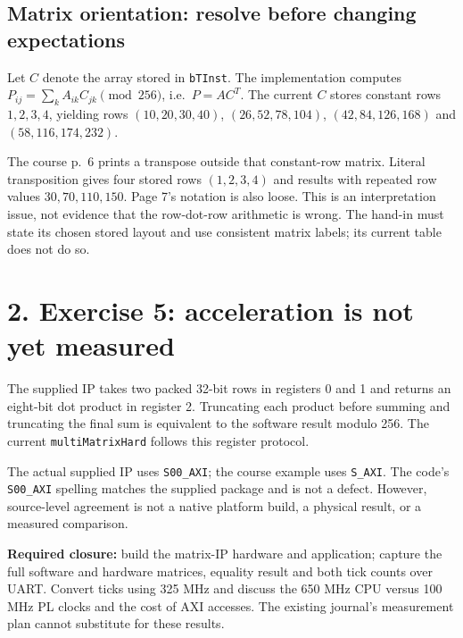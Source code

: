 \documentclass[11pt,a4paper]{article}
\begin{document}
\subsection*{Matrix orientation: resolve before changing expectations}
Let $C$ denote the array stored in \texttt{bTInst}. The implementation computes
$P_{ij}=\sum_k A_{ik}C_{jk}\pmod{256}$, i.e.\ $P=AC^T$.
The current $C$ stores constant rows $1,2,3,4$, yielding rows
$(10,20,30,40)$, $(26,52,78,104)$, $(42,84,126,168)$ and
$(58,116,174,232)$.

The course p.~6 prints a transpose outside that constant-row matrix.
Literal transposition gives four stored rows $(1,2,3,4)$ and results with
repeated row values $30,70,110,150$. Page 7's notation is also loose.
This is an interpretation issue, not evidence that the row-dot-row arithmetic
is wrong. The hand-in must state its chosen stored layout and use consistent
matrix labels; its current table does not do so.

\newpage
\section*{2. Exercise 5: acceleration is not yet measured}
The supplied IP takes two packed 32-bit rows in registers 0 and 1 and returns
an eight-bit dot product in register 2. Truncating each product before summing
and truncating the final sum is equivalent to the software result modulo 256.
The current \texttt{multiMatrixHard} follows this register protocol.

The actual supplied IP uses \texttt{S00\_AXI}; the course example uses
\texttt{S\_AXI}. The code's \texttt{S00\_AXI} spelling matches the supplied
package and is not a defect. However, source-level agreement is not a native
platform build, a physical result, or a measured comparison.

\textbf{Required closure:} build the matrix-IP hardware and application;
capture the full software and hardware matrices, equality result and both
tick counts over UART. Convert ticks using 325 MHz and discuss the 650 MHz
CPU versus 100 MHz PL clocks and the cost of AXI accesses. The existing
journal's measurement plan cannot substitute for these results.
\end{document}
